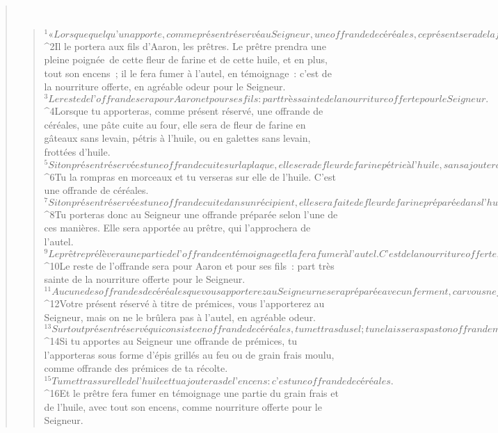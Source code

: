 \begin{verse}
         
      \bchapter{}
      \begin{verse}
${}^{1}« Lorsque quelqu’un apporte, comme présent réservé au Seigneur, une offrande de céréales, ce présent sera de la fleur de farine sur laquelle il versera de l’huile et mettra de l’encens. 
${}^{2}Il le portera aux fils d’Aaron, les prêtres. Le prêtre prendra une pleine poignée de cette fleur de farine et de cette huile, et en plus, tout son encens ; il le fera fumer à l’autel, en témoignage : c’est de la nourriture offerte, en agréable odeur pour le Seigneur. 
${}^{3}Le reste de l’offrande sera pour Aaron et pour ses fils : part très sainte de la nourriture offerte pour le Seigneur.
${}^{4}Lorsque tu apporteras, comme présent réservé, une offrande de céréales, une pâte cuite au four, elle sera de fleur de farine en gâteaux sans levain, pétris à l’huile, ou en galettes sans levain, frottées d’huile.
${}^{5}Si ton présent réservé est une offrande cuite sur la plaque, elle sera de fleur de farine pétrie à l’huile, sans ajouter de levain. 
${}^{6}Tu la rompras en morceaux et tu verseras sur elle de l’huile. C’est une offrande de céréales.
${}^{7}Si ton présent réservé est une offrande cuite dans un récipient, elle sera faite de fleur de farine préparée dans l’huile.
${}^{8}Tu porteras donc au Seigneur une offrande préparée selon l’une de ces manières. Elle sera apportée au prêtre, qui l’approchera de l’autel. 
${}^{9}Le prêtre prélèvera une partie de l’offrande en témoignage et la fera fumer à l’autel. C’est de la nourriture offerte, en agréable odeur pour le Seigneur. 
${}^{10}Le reste de l’offrande sera pour Aaron et pour ses fils : part très sainte de la nourriture offerte pour le Seigneur.
${}^{11}Aucune des offrandes de céréales que vous apporterez au Seigneur ne sera préparée avec un ferment, car vous ne ferez jamais fumer ni du levain ni du miel en nourriture offerte pour le Seigneur. 
${}^{12}Votre présent réservé à titre de prémices, vous l’apporterez au Seigneur, mais on ne le brûlera pas à l’autel, en agréable odeur.
${}^{13}Sur tout présent réservé qui consiste en offrande de céréales, tu mettras du sel ; tu ne laisseras pas ton offrande manquer du sel de l’alliance avec ton Dieu ; avec tout ce que tu réserveras, tu apporteras du sel.
${}^{14}Si tu apportes au Seigneur une offrande de prémices, tu l’apporteras sous forme d’épis grillés au feu ou de grain frais moulu, comme offrande des prémices de ta récolte. 
${}^{15}Tu mettras sur elle de l’huile et tu ajouteras de l’encens : c’est une offrande de céréales. 
${}^{16}Et le prêtre fera fumer en témoignage une partie du grain frais et de l’huile, avec tout son encens, comme nourriture offerte pour le Seigneur.
      

\end{verse}
\end{verse}
